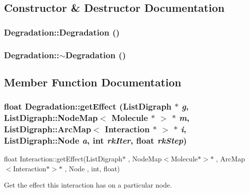 \subsection{Constructor \& Destructor Documentation}
\hypertarget{classDegradation_a1a703897347e37fd019c8ad9ff033d17}{
\subsubsection[{Degradation}]{\setlength{\rightskip}{0pt plus 5cm}Degradation::Degradation ()}}
\label{classDegradation_a1a703897347e37fd019c8ad9ff033d17}
\hypertarget{classDegradation_adb12186e524e71c1d633e6ccfb09e322}{
\subsubsection[{$\sim$Degradation}]{\setlength{\rightskip}{0pt plus 5cm}Degradation::$\sim$Degradation ()}}
\label{classDegradation_adb12186e524e71c1d633e6ccfb09e322}


\subsection{Member Function Documentation}
\hypertarget{classDegradation_a3cad4fc84026c6f627306a7e35527f3c}{
\subsubsection[{getEffect}]{\setlength{\rightskip}{0pt plus 5cm}float Degradation::getEffect (ListDigraph $\ast$ {\em g}, \/  ListDigraph::NodeMap$<$ {\bf Molecule} $\ast$ $>$ $\ast$ {\em m}, \/  ListDigraph::ArcMap$<$ {\bf Interaction} $\ast$ $>$ $\ast$ {\em i}, \/  ListDigraph::Node {\em a}, \/  int {\em rkIter}, \/  float {\em rkStep})}}
\label{classDegradation_a3cad4fc84026c6f627306a7e35527f3c}
float Interaction::getEffect(ListDigraph$\ast$ , NodeMap$<$Molecule$\ast$$>$$\ast$ , ArcMap$<$Interaction$\ast$$>$$\ast$ , Node , int, float)

Get the effect this interaction has on a particular node.

